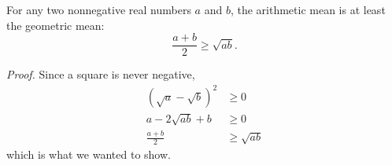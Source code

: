 \documentclass{article}
\begin{document}
For any two nonnegative real numbers $a$ and $b$, the arithmetic mean is
at least the geometric mean:
\[
\frac{a+b}{2} \geq \sqrt{ab}.
\]

\noindent\textit{Proof.} Since a square is never negative,
\begin{align*}
(\sqrt{a} - \sqrt{b})^2 &\geq 0 \\
a - 2\sqrt{ab} + b &\geq 0 \\
\frac{a+b}{2} &\geq \sqrt{ab}
\end{align*}
which is what we wanted to show.
\end{document}
